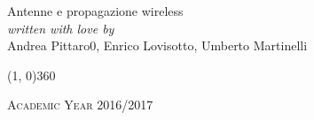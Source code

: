 \documentclass[a4paper, 12pt, twoside, openright, fleqn]{book}
\theoremstyle{theoremdd}
\theoremstyle{remark}
\begin{document}
\begin{titlepage}
	\begin{center}
		\hspace{0.5cm}
		\Large{Antenne e propagazione wireless} \\
		\vspace{1cm}
		\vspace{0.5cm}
		\emph{written with love by} \\
		\vspace{0.5cm}
		{\Large Andrea Pittaro0, Enrico Lovisotto, Umberto Martinelli}
	\end{center}

	\vfill

	\begin{center}
		\line(1, 0){360}

		\textsc{Academic Year 2016/2017}
	\end{center}
\end{titlepage}

\tableofcontents
\clearpage





\end{document}
